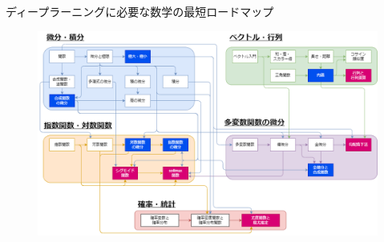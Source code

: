 \documentclass[dvipdfmx,aspectratio=169]{beamer}
\begin{document}
	\begin{frame}{ディープラーニングに必要な数学の最短ロードマップ}
		\begin{figure}
			\centering
			\includegraphics[width=0.85\linewidth]{img/math-roadmap}
		\end{figure}
	\end{frame}
	
\end{document}
